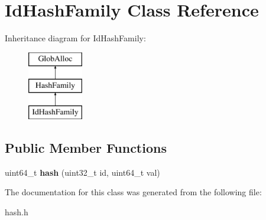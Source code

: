 \hypertarget{classIdHashFamily}{\section{Id\-Hash\-Family Class Reference}
\label{classIdHashFamily}
}
Inheritance diagram for Id\-Hash\-Family\-:\begin{figure}[H]
\begin{center}
\leavevmode
\includegraphics[height=3.000000cm]{classIdHashFamily}
\end{center}
\end{figure}
\subsection*{Public Member Functions}
\begin{DoxyCompactItemize}
\item 
\hypertarget{classIdHashFamily_ad7d484fe595d5f7e94af443ced0e29ea}{uint64\-\_\-t {\bfseries hash} (uint32\-\_\-t id, uint64\-\_\-t val)}\label{classIdHashFamily_ad7d484fe595d5f7e94af443ced0e29ea}

\end{DoxyCompactItemize}


The documentation for this class was generated from the following file\-:\begin{DoxyCompactItemize}
\item 
hash.\-h\end{DoxyCompactItemize}
